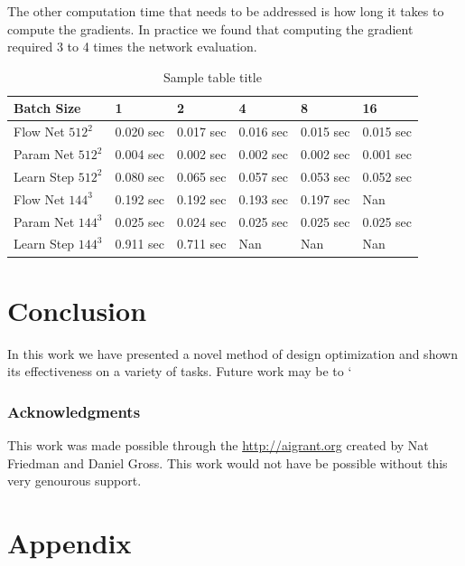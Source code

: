 \documentclass{article} %
\begin{document}
The other computation time that needs to be addressed is how long it takes to compute the gradients. In practice we found that computing the gradient required 3 to 4 times the network evaluation.


\begin{table}[t]
\caption{Sample table title}
\label{computation_table}
\begin{center}
\begin{tabular}{l|lllll}
Batch Size & 1 & 2 & 4 & 8 & 16 \\ \hline 
Flow Net $512^2$ & 0.020 sec & 0.017 sec & 0.016 sec & 0.015 sec & 0.015 sec \\ 
Param Net $512^2$ & 0.004 sec & 0.002 sec & 0.002 sec & 0.002 sec & 0.001 sec \\ 
Learn Step $512^2$ & 0.080 sec & 0.065 sec & 0.057 sec & 0.053 sec & 0.052 sec \\ 
Flow Net $144^3$ & 0.192 sec & 0.192 sec & 0.193 sec & 0.197 sec & Nan \\ 
Param Net $144^3$ & 0.025 sec & 0.024 sec & 0.025 sec & 0.025 sec & 0.025 sec \\ 
Learn Step $144^3$ & 0.911 sec & 0.711 sec & Nan & Nan & Nan \\ 
\end{tabular}
\end{center}
\end{table}




\section{Conclusion}

In this work we have presented a novel method of design optimization and shown its effectiveness on a variety of tasks. Future work may be to `

\subsubsection*{Acknowledgments}

This work was made possible through the \url{http://aigrant.org} created by Nat Friedman and Daniel Gross. This work would not have be possible without this very genourous support.




\section{Appendix}
\end{document}
